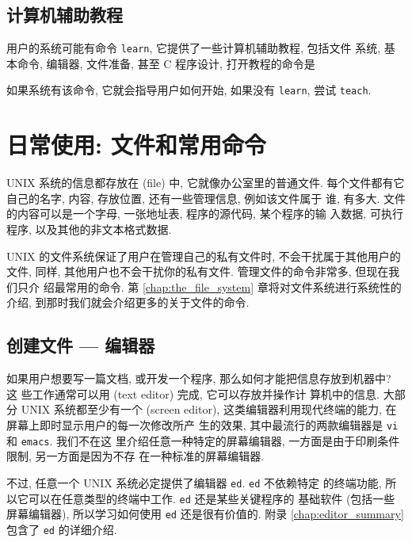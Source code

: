 \subsection{计算机辅助教程}
\label{subsec:computer_aided_instruction}

用户的系统可能有命令 \texttt{learn}, 它提供了一些计算机辅助教程, 包括文件
系统, 基本命令, 编辑器, 文件准备, 甚至 C 程序设计, 打开教程的命令是
如果系统有该命令, 它就会指导用户如何开始, 如果没有 \texttt{learn}, 尝试
\texttt{teach}.

\section{日常使用: 文件和常用命令}
\label{sec:day_to_day_use_files_and_common_commands}

UNIX 系统的信息都存放在  (file) 中, 它就像办公室里的普通文件.
每个文件都有它自己的名字, 内容, 存放位置, 还有一些管理信息, 例如该文件属于
谁, 有多大. 文件的内容可以是一个字母, 一张地址表, 程序的源代码, 某个程序的输
入数据, 可执行程序, 以及其他的非文本格式数据.

UNIX 的文件系统保证了用户在管理自己的私有文件时, 不会干扰属于其他用户的文件,
同样, 其他用户也不会干扰你的私有文件. 管理文件的命令非常多, 但现在我们只介
绍最常用的命令. 第 \ref{chap:the_file_system} 章将对文件系统进行系统性的介绍,
到那时我们就会介绍更多的关于文件的命令.

\subsection{创建文件 --- 编辑器}
\label{subsec:creating_files_the_editor}

如果用户想要写一篇文档, 或开发一个程序, 那么如何才能把信息存放到机器中? 这
些工作通常可以用  (text editor) 完成, 它可以存放并操作计
算机中的信息. 大部分 UNIX 系统都至少有一个  (screen
editor), 这类编辑器利用现代终端的能力, 在屏幕上即时显示用户的每一次修改所产
生的效果, 其中最流行的两款编辑器是 \texttt{vi} 和 \texttt{emacs}. 我们不在这
里介绍任意一种特定的屏幕编辑器, 一方面是由于印刷条件限制, 另一方面是因为不存
在一种标准的屏幕编辑器.

不过, 任意一个 UNIX 系统必定提供了编辑器 \texttt{ed}. \texttt{ed} 不依赖特定
的终端功能, 所以它可以在任意类型的终端中工作. \texttt{ed} 还是某些关键程序的
基础软件 (包括一些屏幕编辑器), 所以学习如何使用 \texttt{ed} 还是很有价值的.
附录 \ref{chap:editor_summary} 包含了 \texttt{ed} 的详细介绍.

